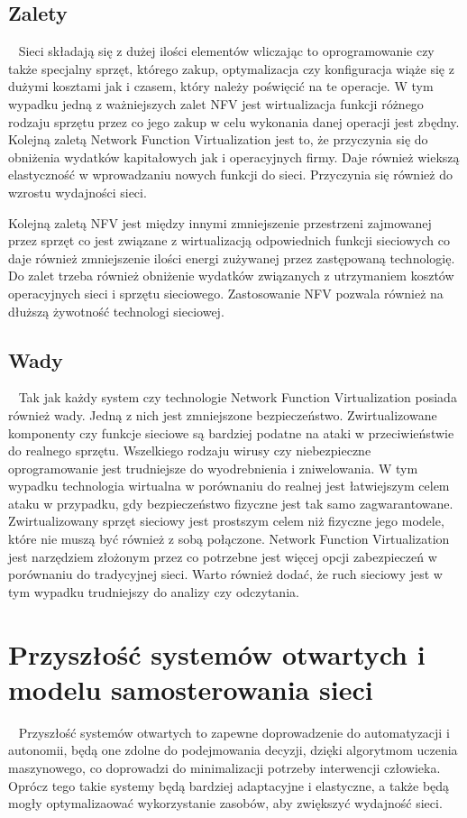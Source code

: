 \documentclass[sn-mathphys,Numbered]{sn-jnl}
\theoremstyle{thmstyleone}%
\theoremstyle{thmstyletwo}%
\theoremstyle{thmstylethree}%
\begin{document}
\subsection{Zalety}
~   Sieci składają się z dużej ilości elementów wliczając to oprogramowanie czy także specjalny sprzęt, którego zakup, optymalizacja czy konfiguracja wiąże się z dużymi kosztami jak i czasem, który należy poświęcić na te operacje. W tym wypadku jedną z ważniejszych zalet NFV jest wirtualizacja funkcji różnego rodzaju sprzętu przez co jego zakup w celu wykonania danej operacji jest zbędny. Kolejną zaletą Network Function Virtualization jest to, że przyczynia się do obniżenia wydatków kapitałowych jak i operacyjnych firmy. Daje również wiekszą elastyczność w wprowadzaniu nowych funkcji do sieci. Przyczynia się również do wzrostu wydajności sieci\cite{kaur_architectural_2020}.

Kolejną zaletą NFV jest między innymi zmniejszenie przestrzeni zajmowanej przez sprzęt co jest związane z wirtualizacją odpowiednich funkcji sieciowych co daje również zmniejszenie ilości energi zużywanej przez zastępowaną technologię. Do zalet trzeba również obniżenie wydatków związanych z utrzymaniem kosztów operacyjnych sieci i sprzętu sieciowego. Zastosowanie NFV pozwala również na dłuższą żywotność technologi sieciowej\cite{corporation_what_nodate-1}.

\subsection{Wady}
~   Tak jak każdy system czy technologie Network Function Virtualization posiada również wady. Jedną z nich jest zmniejszone bezpieczeństwo. Zwirtualizowane komponenty czy funkcje sieciowe są bardziej podatne na ataki w przeciwieństwie do realnego sprzętu. Wszelkiego rodzaju wirusy czy niebezpieczne oprogramowanie jest trudniejsze do wyodrebnienia i zniwelowania. W tym wypadku technologia wirtualna w porównaniu do realnej jest łatwiejszym celem ataku w przypadku, gdy bezpieczeństwo fizyczne jest tak samo zagwarantowane. Zwirtualizowany sprzęt sieciowy jest prostszym celem niż fizyczne jego modele, które nie muszą być również z sobą połączone. Network Function Virtualization jest narzędziem złożonym przez co potrzebne jest więcej opcji zabezpieczeń w porównaniu do tradycyjnej sieci. Warto również dodać, że ruch sieciowy jest w tym wypadku trudniejszy do analizy czy odczytania\cite{noauthor_what_nodate-2}.

\section{Przyszłość systemów otwartych i modelu samosterowania sieci}
~ Przyszłość systemów otwartych to zapewne doprowadzenie do automatyzacji i autonomii, będą one zdolne do podejmowania decyzji, dzięki algorytmom uczenia maszynowego, co doprowadzi do minimalizacji potrzeby interwencji człowieka. Oprócz tego takie systemy będą bardziej adaptacyjne i elastyczne, a także będą mogły optymalizaować wykorzystanie zasobów, aby zwiększyć wydajność sieci.
\end{document}
